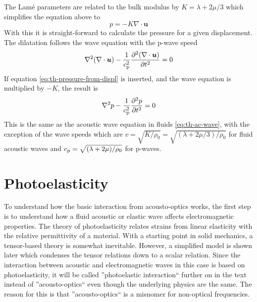 \documentclass[11pt,twoside]{eitExjobb}
\begin{document}
	The Lamé parameters are related to the bulk modulus by $K = \lambda + 2\mu/3$ \cite{Irgens2008} which simplifies the equation above to
	\begin{equation}
		p = -K \nabla \cdot \bm{u}
		\label{eq:th-pressure-from-displ}
	\end{equation}
	With this it is straight-forward to calculate the pressure for a given displacement. The dilatation follows the wave equation with the p-wave speed \cite{Schmerr2016}
	\begin{equation*}
		\nabla^2 (\nabla \cdot \bm{u}) - \frac{1}{c_{\mathrm{p}}^2} \frac{\partial^2 (\nabla \cdot \bm{u})}{\partial t^2} = 0
	\end{equation*}
	If equation \eqref{eq:th-pressure-from-displ} is inserted, and the wave equation is multiplied by $-K$, the result is
	\begin{equation*}
		\nabla^2 p - \frac{1}{c_{\mathrm{p}}^2} \frac{\partial^2 p}{\partial t^2} = 0
	\end{equation*}
	This is the same as the acoustic wave equation in fluids \eqref{eq:th-ac-wave}, with the exception of the wave speeds which are $v = \sqrt{K/\rho_0} = \sqrt{(\lambda + 2\mu/3)/\rho_0}$ for fluid acoustic waves and $c_{\mathrm{p}} = \sqrt{(\lambda + 2\mu)/\rho_0}$ for p-waves.
	
	
	\section{Photoelasticity}
	To understand how the basic interaction from acousto-optics works, the first step is to understand how a fluid acoustic or elastic wave affects electromagnetic properties. The theory of photoelasticity relates strains from linear elasticity with the relative permittivity of a material. With a starting point in solid mechanics, a tensor-based theory is somewhat inevitable. However, a simplified model is shown later which condenses the tensor relations down to a scalar relation. Since the interaction between acoustic and electromagnetic waves in this case is based on photoelasticity, it will be called ''photoelastic interaction`` further on in the text instead of ''acousto-optics`` even though the underlying physics are the same. The reason for this is that ''acousto-optics`` is a misnomer for non-optical frequencies.
	
\end{document}

